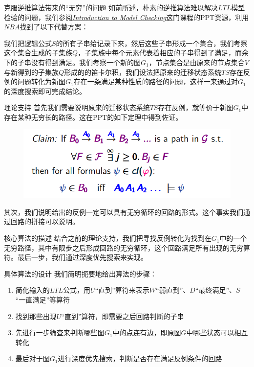 \documentclass[english]{pkuslide}
\begin{document}
\begin{frame}{克服逆推算法带来的“无穷”的问题}
如前所述，朴素的逆推算法难以解决$LTL$模型检验的问题，我们参阅\nocite{*}\href{https://moves.rwth-aachen.de/teaching/ss-16/ss16introduction-to-model-checking/}{\emph{Introduction to Model Checking}}这门课程的PPT资源，利用$NBA$找到了以下代替方案：

我们把逻辑公式$S$的所有子串给记录下来，然后这些子串形成一个集合，我们考察这个集合生成的子集族$Q$，子集族中每个元素代表着相应的子串得到了满足，而余下的子串没有得到满足。我们考察一个新的图$G_{1}$，节点集合是由原来的节点集合$V$与新得到的子集族$Q$形成的的笛卡尔积，我们设法把原来的迁移状态系统$TS$存在反例的问题转化为新图$G_{1}$存在一条满足某种性质的路径的问题，这样一来通过对$G_{1}$的深度搜索即可完成结论。
\end{frame}
\begin{frame}{理论支持}
首先我们需要说明原来的迁移状态系统$TS$存在反例，就等价于新图$G_{1}$中存在某种无穷长的路径。这在PPT的如下定理中得到佐证。
\begin{figure}
\centering
\includegraphics[height=0.4\textheight]{Figure_1.png}
\end{figure}
其次，我们说明给出的反例一定可以具有无穷循环的回路的形式。这个事实我们通过回路的拼接可以说明。
\end{frame}
\begin{frame}{核心算法的描述}
结合之前的理论支持，我们把寻找反例转化为找到在$G_{1}$中的一个无穷路径，其中有限步之后形成回路的无穷循环，这个回路满足所有出现的无穷算符。最后一步，我们通过深度优先搜索来实现。
\end{frame}
\begin{frame}{具体算法的设计}
我们简明扼要地给出算法的步骤：
\begin{enumerate}[<+->]
\item 简化输入的$LTL$公式，用$U$“直到”算符来表示$W$“弱直到”、$D$“最终满足”、$S$“一直满足”等算符
\item 找到那些出现$U$“直到”算符，即需要之后回路判断的子串
\item 先进行一步筛查来判断哪些图$G_{1}$中的点连有边，即原图$G$中哪些状态可以相互转化
\item 最后对于图$G_{1}$进行深度优先搜索，判断是否存在满足反例条件的回路
\end{enumerate}
\end{frame}
\end{document}
